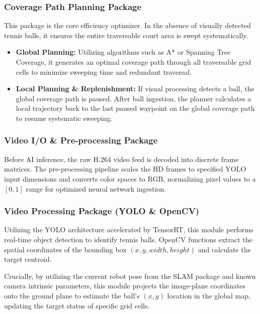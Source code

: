 \subsubsection{Coverage Path Planning Package}
\label{sec:path-planning}
This package is the core efficiency optimizer. In the absence of visually detected tennis balls, it ensures the entire traversable court area is swept systematically.
\begin{itemize}
  \item \textbf{Global Planning:} Utilizing algorithms such as A* or Spanning Tree Coverage, it generates an optimal coverage path through all traversable grid cells to minimize sweeping time and redundant traversal.
  \item \textbf{Local Planning \& Replenishment:} If visual processing detects a ball, the global coverage path is paused. After ball ingestion, the planner calculates a local trajectory back to the last paused waypoint on the global coverage path to resume systematic sweeping.
\end{itemize}

\subsubsection{Video I/O \& Pre-processing Package}
\label{sec:preprocessing}
Before AI inference, the raw H.264 video feed is decoded into discrete frame matrices. The pre-processing pipeline scales the HD frames to specified YOLO input dimensions and converts color spaces to RGB, normalizing pixel values to a $[0, 1]$ range for optimized neural network ingestion.

\subsubsection{Video Processing Package (YOLO \& OpenCV)}
\label{sec:video-processing}
Utilizing the YOLO architecture accelerated by TensorRT, this module performs real-time object detection to identify tennis balls. OpenCV functions extract the spatial coordinates of the bounding box $(x, y, width, height)$ and calculate the target centroid. 

Crucially, by utilizing the current robot pose from the SLAM package and known camera intrinsic parameters, this module projects the image-plane coordinates onto the ground plane to estimate the ball's $(x, y)$ location in the global map, updating the target status of specific grid cells.

